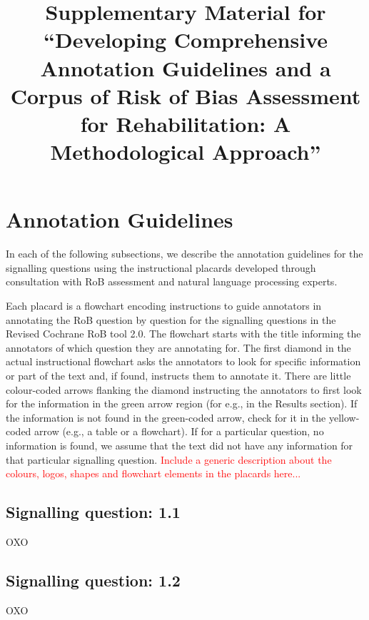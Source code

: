\documentclass[sn-mathphys,Numbered]{sn-jnl}%
\begin{document}
\title[Article Title]{Supplementary Material for ``Developing Comprehensive Annotation Guidelines and a Corpus of Risk of Bias Assessment for Rehabilitation: A Methodological Approach''}



\maketitle


\section{Annotation Guidelines}
\label{sec:guidelines}
%
In each of the following subsections, we describe the annotation guidelines for the signalling questions using the instructional placards developed through consultation with RoB assessment and natural language processing experts.

Each placard is a flowchart encoding instructions to guide annotators in annotating the RoB question by question for the signalling questions in the Revised Cochrane RoB tool 2.0.
The flowchart starts with the title informing the annotators of which question they are annotating for.
The first diamond in the actual instructional flowchart asks the annotators to look for specific information or part of the text and, if found, instructs them to annotate it.
There are little colour-coded arrows flanking the diamond instructing the annotators to first look for the information in the green arrow region (for e.g., in the Results section). 
If the information is not found in the green-coded arrow, check for it in the yellow-coded arrow (e.g., a table or a flowchart).
If for a particular question, no information is found, we assume that the text did not have any information for that particular signalling question.
\textcolor{red}{Include a generic description about the colours, logos, shapes and flowchart elements in the placards here...}
%
%
%
\subsection{Signalling question: 1.1}
%
OXO
%
%
%
\subsection{Signalling question: 1.2}
%
OXO
%
%
%
\end{document}
